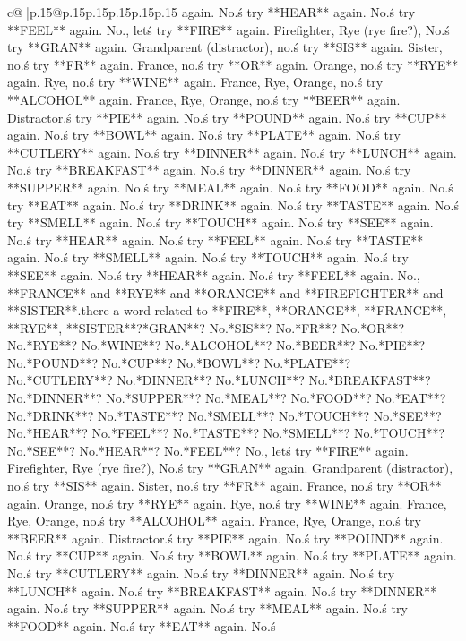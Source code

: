 \documentclass{article}
\begin{document}
{\begin{supertabular}{c@{$\;$}|p{.15\linewidth}@{}p{.15\linewidth}p{.15\linewidth}p{.15\linewidth}p{.15\linewidth}p{.15\linewidth}}
{{{again. No.\nLet\'s try **HEAR** again. No.\nLet\'s try **FEEL** again. No.\n\nOkay, let\'s try **FIRE** again. Firefighter, Rye (rye fire?), No.\nLet\'s try **GRAN** again. Grandparent (distractor), no.\nLet\'s try **SIS** again. Sister, no.\nLet\'s try **FR** again. France, no.\nLet\'s try **OR** again. Orange, no.\nLet\'s try **RYE** again. Rye, no.\nLet\'s try **WINE** again. France, Rye, Orange, no.\nLet\'s try **ALCOHOL** again. France, Rye, Orange, no.\nLet\'s try **BEER** again. Distractor.\nLet\'s try **PIE** again. No.\nLet\'s try **POUND** again. No.\nLet\'s try **CUP** again. No.\nLet\'s try **BOWL** again. No.\nLet\'s try **PLATE** again. No.\nLet\'s try **CUTLERY** again. No.\nLet\'s try **DINNER** again. No.\nLet\'s try **LUNCH** again. No.\nLet\'s try **BREAKFAST** again. No.\nLet\'s try **DINNER** again. No.\nLet\'s try **SUPPER** again. No.\nLet\'s try **MEAL** again. No.\nLet\'s try **FOOD** again. No.\nLet\'s try **EAT** again. No.\nLet\'s try **DRINK** again. No.\nLet\'s try **TASTE** again. No.\nLet\'s try **SMELL** again. No.\nLet\'s try **TOUCH** again. No.\nLet\'s try **SEE** again. No.\nLet\'s try **HEAR** again. No.\nLet\'s try **FEEL** again. No.\nLet\'s try **TASTE** again. No.\nLet\'s try **SMELL** again. No.\nLet\'s try **TOUCH** again. No.\nLet\'s try **SEE** again. No.\nLet\'s try **HEAR** again. No.\nLet\'s try **FEEL** again. No.\n\nWait, **FRANCE** and **RYE** and **ORANGE** and **FIREFIGHTER** and **SISTER**.\nIs there a word related to **FIRE**, **ORANGE**, **FRANCE**, **RYE**, **SISTER**?\nMaybe **GRAN**? No.\nMaybe **SIS**? No.\nMaybe **FR**? No.\nMaybe **OR**? No.\nMaybe **RYE**? No.\nMaybe **WINE**? No.\nMaybe **ALCOHOL**? No.\nMaybe **BEER**? No.\nMaybe **PIE**? No.\nMaybe **POUND**? No.\nMaybe **CUP**? No.\nMaybe **BOWL**? No.\nMaybe **PLATE**? No.\nMaybe **CUTLERY**? No.\nMaybe **DINNER**? No.\nMaybe **LUNCH**? No.\nMaybe **BREAKFAST**? No.\nMaybe **DINNER**? No.\nMaybe **SUPPER**? No.\nMaybe **MEAL**? No.\nMaybe **FOOD**? No.\nMaybe **EAT**? No.\nMaybe **DRINK**? No.\nMaybe **TASTE**? No.\nMaybe **SMELL**? No.\nMaybe **TOUCH**? No.\nMaybe **SEE**? No.\nMaybe **HEAR**? No.\nMaybe **FEEL**? No.\nMaybe **TASTE**? No.\nMaybe **SMELL**? No.\nMaybe **TOUCH**? No.\nMaybe **SEE**? No.\nMaybe **HEAR**? No.\nMaybe **FEEL**? No.\n\nOkay, let\'s try **FIRE** again. Firefighter, Rye (rye fire?), No.\nLet\'s try **GRAN** again. Grandparent (distractor), no.\nLet\'s try **SIS** again. Sister, no.\nLet\'s try **FR** again. France, no.\nLet\'s try **OR** again. Orange, no.\nLet\'s try **RYE** again. Rye, no.\nLet\'s try **WINE** again. France, Rye, Orange, no.\nLet\'s try **ALCOHOL** again. France, Rye, Orange, no.\nLet\'s try **BEER** again. Distractor.\nLet\'s try **PIE** again. No.\nLet\'s try **POUND** again. No.\nLet\'s try **CUP** again. No.\nLet\'s try **BOWL** again. No.\nLet\'s try **PLATE** again. No.\nLet\'s try **CUTLERY** again. No.\nLet\'s try **DINNER** again. No.\nLet\'s try **LUNCH** again. No.\nLet\'s try **BREAKFAST** again. No.\nLet\'s try **DINNER** again. No.\nLet\'s try **SUPPER** again. No.\nLet\'s try **MEAL** again. No.\nLet\'s try **FOOD** again. No.\nLet\'s try **EAT** again. No.\nLet\'s }}}
\end{supertabular}}
\end{document}
